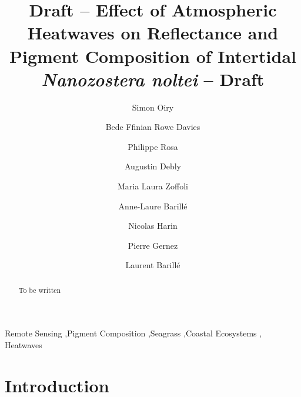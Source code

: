 \documentclass[
  number]{elsarticle}
\begin{document}
\begin{frontmatter}
\title{Draft -- Effect of Atmospheric Heatwaves on Reflectance and
Pigment Composition of Intertidal \emph{Nanozostera noltei} -- Draft}
\author[1]{Simon Oiry%
%
}
\author[1]{Bede Ffinian Rowe Davies%
%
}

\author[1]{Philippe Rosa%
%
}

\author[1]{Augustin Debly%
%
}

\author[2]{Maria Laura Zoffoli%
%
}

\author[3]{Anne-Laure Barillé%
%
}

\author[3]{Nicolas Harin%
%
}

\author[1]{Pierre Gernez%
%
}

\author[1]{Laurent Barillé%
%
}












        
\begin{abstract}
To be written
\end{abstract}





\begin{keyword}
    Remote Sensing \sep Pigment Composition \sep Seagrass \sep Coastal
Ecosystems \sep 
    Heatwaves
\end{keyword}
\end{frontmatter}
    

\section{Introduction}\label{introduction}
\end{document}
